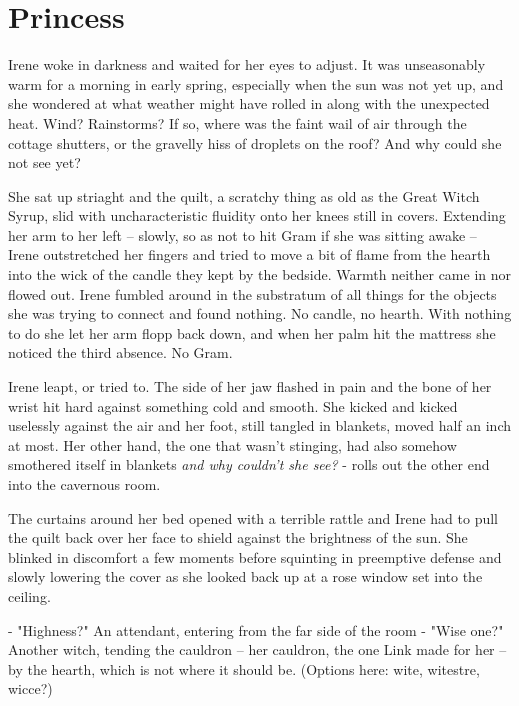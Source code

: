\documentclass[../FGP.tex]{subfiles}
\begin{document}
\section{Princess}
\begin{fragment}
Irene woke in darkness and waited for her eyes to adjust. It was unseasonably warm for a morning in early spring, especially when the sun was not yet up, and she wondered at what weather might have rolled in along with the unexpected heat. Wind? Rainstorms? If so, where was the faint wail of air through the cottage shutters, or the gravelly hiss of droplets on the roof? And why could she not see yet?

She sat up striaght and the quilt, a scratchy thing as old as the Great Witch Syrup, slid with uncharacteristic fluidity onto her knees still in covers. Extending her arm to her left -- slowly, so as not to hit Gram if she was sitting awake -- Irene outstretched her fingers and tried to move a bit of flame from the hearth into the wick of the candle they kept by the bedside. Warmth neither came in nor flowed out. Irene fumbled around in the substratum of all things for the objects she was trying to connect and found nothing. No candle, no hearth. With nothing to do she let her arm flopp back down, and when her palm hit the mattress she noticed the third absence. No Gram.

Irene leapt, or tried to. The side of her jaw flashed in pain and the bone of her wrist hit hard against something cold and smooth. She kicked and kicked uselessly against the air and her foot, still tangled in blankets, moved half an inch at most. Her other hand, the one that wasn't stinging, had also somehow smothered itself in blankets \emph{and why couldn't she see?} 
   - rolls out the other end into the cavernous room.

The curtains around her bed opened with a terrible rattle and Irene had to pull the quilt back over her face to shield against the brightness of the sun. She blinked in discomfort a few moments before squinting in preemptive defense and slowly lowering the cover as she looked back up at a rose window set into the ceiling.

 - "Highness?" An attendant, entering from the far side of the room 
 - "Wise one?" Another witch, tending the cauldron -- her cauldron, the one Link made for her -- by the hearth, which is not where it should be. (Options here: wite, witestre, wicce?)


\end{fragment}
\end{document}
